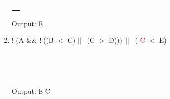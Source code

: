 \documentclass[a4paper]{article}
\begin{document}
\begin{large}
\begin{enumerate}
\begin{tabular}[t]{ | p{1.6em} | }
            \makecell{}    \\ \hline
            \makecell{$<$} \\ \hline
            \makecell{)}   \\ \hline
          \end{tabular}
          \hspace{2em}
          Output: E
    \item
          ! (A \&\& ! ((B $<$ C) $||$ \ (C $>$ D)))\ $||$ \ (  \textcolor{red}{C} $<$ E)\\
          \\
          \begin{tabular}[t]{ | p{1.6em} | }
            \makecell{ }   \\ \hline
            \makecell{}    \\ \hline
            \makecell{}    \\ \hline
            \makecell{}    \\ \hline
            \makecell{$<$} \\ \hline
            \makecell{)}   \\ \hline
          \end{tabular}
          \hspace{2em}
          Output: E C


\end{enumerate}
\end{large}
\end{document}

